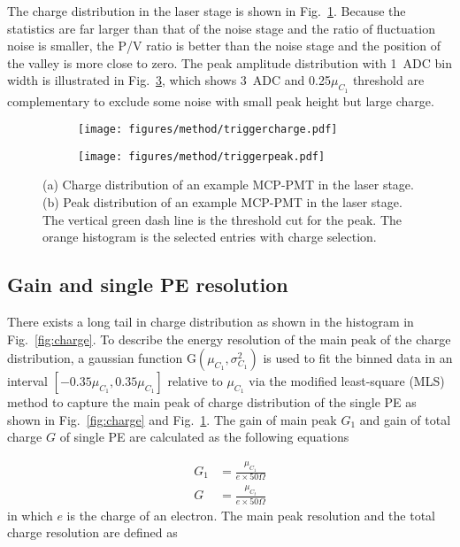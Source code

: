 The charge distribution in the laser stage is shown in Fig.~\ref{fig:triggercharge}. Because the statistics are far larger than that of the noise stage and the ratio of fluctuation noise is smaller, the P/V ratio is better than the noise stage and the position of the valley is more close to zero. The peak amplitude distribution with \SI{1}{ADC} bin width is illustrated in Fig.~\ref{fig:triggerpeak}, which shows \SI{3}{ADC} and 0.25$\mu_{C_1}$ threshold are complementary to exclude some noise with small peak height but large charge.

\begin{figure}[!htbp]
    \centering
    \begin{subfigure}[b]{0.4\textwidth}
        \texttt{[image: figures/method/triggercharge.pdf]}
        \caption{}%
        \label{fig:triggercharge}
    \end{subfigure}
    \begin{subfigure}[b]{0.4\textwidth}
        \texttt{[image: figures/method/triggerpeak.pdf]}
        \caption{}%
        \label{fig:triggerpeak}
    \end{subfigure}
    \caption{(a) Charge distribution of an example MCP-PMT in the laser stage. (b) Peak distribution of an example MCP-PMT in the laser stage. The vertical green dash line is the threshold cut for the peak. The orange histogram is the selected entries with charge selection.}
\end{figure}

\subsection{Gain and single PE resolution}
\label{sec:noisegain}

There exists a long tail in charge distribution as shown in the histogram in Fig.~\ref{fig:charge}. To describe the energy resolution of the main peak of the charge distribution, a gaussian function G$(\mu_{C_1},\sigma^2_{C_1})$ is used to fit the binned data in an interval $[-0.35\mu_{C_1}, 0.35\mu_{C_1}]$ relative to $\mu_{C_1}$ via the modified least-square (MLS) method \cite{Cowan1998StatisticalDA} to capture the main peak of charge distribution of the single PE as shown in Fig.~\ref{fig:charge} and Fig.~\ref{fig:triggercharge}. The gain of main peak $G_1$ and gain of total charge $G$ of single PE are calculated as the following equations

\begin{align}
    G_1&=\frac{\mu_{C_1}}{e\times 50\Omega} \\
    G &= \frac{\mu_{C_t}}{e\times 50\Omega}
\end{align}
in which $e$ is the charge of an electron. The main peak resolution and the total charge resolution are defined as

